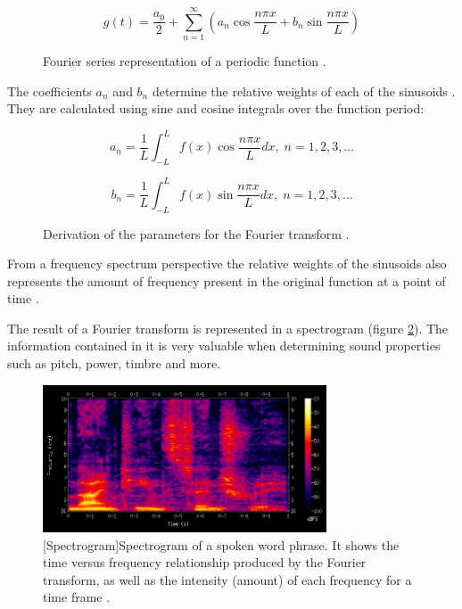 \begin{figure}[H]
    \label{fig:fourierseriesequation}
    \begin{equation}
        g(t) = \frac{a_0}{2} + \sum_{n=1}^{\infty}({a_n}\cos\frac{n{\pi}x}{L} + {b_n}\sin\frac{n{\pi}x}{L})
    \end{equation}
    \caption[Fourier transformation equation for periodic functions]{Fourier series representation of a periodic function \cite{fourierequations}.}
\end{figure}

The coefficients $a_n$ and $b_n$ determine the relative weights of each of the
sinusoids \cite{fourierseries}. They are calculated using sine and cosine
integrals over the function period:

\begin{figure}[H]
    \begin{equation}
        a_n = \frac{1}{L}\int_{-L}^{L}f(x)\cos\frac{n{\pi}x}{L}dx,\; n = 1,2,3,\dots
    \end{equation}

    \begin{equation}
        b_n = \frac{1}{L}\int_{-L}^{L}f(x)\sin\frac{n{\pi}x}{L}dx,\; n = 1,2,3,\dots
    \end{equation}
    \caption[Fourier series parameter derivation]{Derivation of the parameters for the Fourier transform \cite{fourierequations}.}
\end{figure}



From a frequency spectrum perspective the relative weights of the sinusoids also
represents the amount of frequency present in the original function at a point
of time \cite{wiki:fourier}. 

The result of a Fourier transform is represented in a spectrogram (figure
\ref{fig:spectrogram}). The information contained in it is very valuable when
determining sound properties such as pitch, power, timbre and more.

\begin{figure}[H]
    \centering
    \includegraphics[width=0.75\textwidth]{BackgroundTheory/spectrogram.png}
    [Spectrogram]{Spectrogram of a spoken word phrase. It shows the time versus frequency relationship produced by the Fourier transform, as well as the intensity (amount) of each frequency for a time frame \cite{wiki:spectrogram}.}
    \label{fig:spectrogram}
\end{figure}

